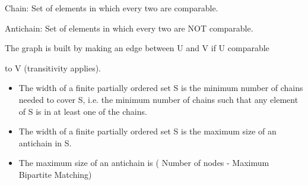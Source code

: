 Chain: Set of elements in which every two are comparable.

Antichain: Set of elements in which every two are NOT comparable.

The graph is built by making an edge between U and V if U comparable

to V (transitivity applies).

\begin{itemize}
  \item The width of a finite partially ordered set S is the minimum number of chains needed to cover S, i.e. the minimum number of chains such that any element of S is in at least one of the chains.
  \item The width of a finite partially ordered set S is the maximum size of an antichain in S.
  \item The maximum size of an antichain is ( Number of nodes - Maximum Bipartite Matching)
\end{itemize}
